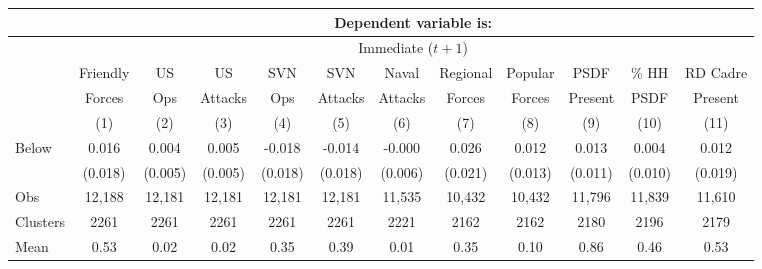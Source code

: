 \begin{tabular}{lccccccccccc}
\hline  & \multicolumn{11}{c}{Dependent variable is:}\\
\hline  & \multicolumn{11}{c}{Immediate ($ t+1$)}\\
 & Friendly & US & US & SVN & SVN & Naval & Regional & Popular & PSDF & \% HH & RD Cadre\\
 & Forces & Ops & Attacks & Ops & Attacks & Attacks & Forces & Forces & Present & PSDF & Present\\
 & (1) & (2) & (3) & (4) & (5) & (6) & (7) & (8) & (9) & (10) & (11)\\
\hline Below & 0.016 & 0.004 & 0.005 & -0.018 & -0.014 & -0.000 & 0.026 & 0.012 & 0.013 & 0.004 & 0.012\\
 & (0.018) & (0.005) & (0.005) & (0.018) & (0.018) & (0.006) & (0.021) & (0.013) & (0.011) & (0.010) & (0.019)\\
Obs & 12,188 & 12,181 & 12,181 & 12,181 & 12,181 & 11,535 & 10,432 & 10,432 & 11,796 & 11,839 & 11,610\\
Clusters & 2261  & 2261  & 2261  & 2261  & 2261  & 2221  & 2162  & 2162  & 2180  & 2196  & 2179 \\
Mean & 0.53 & 0.02 & 0.02 & 0.35 & 0.39 & 0.01 & 0.35 & 0.10 & 0.86 & 0.46 & 0.53\\
\hline\end{tabular}\\
